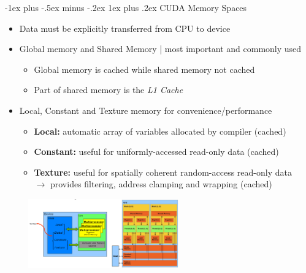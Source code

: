 \documentclass[10pt,landscape]{article}
\makeatletter
\newcommand{\subsubsubsection}{\@startsection{subsubsection}{3}{0mm}%
                                {-1ex plus -.5ex minus -.2ex}%
                                {1ex plus .2ex}%
                                {\normalfont\scriptsize\bfseries}}
\makeatother
\begin{document}
\begin{multicols*}{3}
\subsubsubsection{CUDA Memory Spaces}
\begin{itemize}[topsep=0pt,noitemsep,wide=0pt, leftmargin=\dimexpr{} + 2\relax]
    \item Data must be explicitly transferred from CPU to device
    \item Global memory and Shared Memory | most important and commonly used
    \begin{itemize}[topsep=0pt,noitemsep,wide=0pt, leftmargin=\dimexpr{} + 2\relax]
        \item Global memory is cached while shared memory not cached
        \item Part of shared memory is the \textit{L1 Cache}
    \end{itemize}
    \item Local, Constant and Texture memory for convenience/performance
    \begin{itemize}[topsep=0pt,noitemsep,wide=0pt, leftmargin=\dimexpr{} + 2\relax]
        \item \textbf{Local:} automatic array of variables allocated by compiler (cached)
        \item \textbf{Constant:} useful for uniformly-accessed read-only data (cached)
        \item \textbf{Texture:} useful for spatially coherent random-access read-only data \\ $\rightarrow$ provides filtering, address clamping and wrapping (cached)
    \end{itemize}
\end{itemize}

\includegraphics*[width=8.5cm, height=3cm]{images/cudamemorymodel.png}



\end{multicols*}
\end{document}
